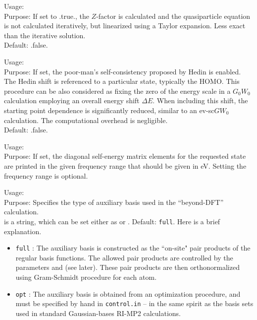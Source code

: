 { \noindent
  Usage:    \\[1.0ex]
  Purpose: If set to .true., the $Z$-factor is calculated
  and the quasiparticle equation is not calculated iteratively,
  but linearized using a Taylor expansion. Less exact than the
  iterative solution. 
   \\
  Default: .false.
}

{ \noindent
  Usage:    \\[1.0ex]
  Purpose: If set, the poor-man's self-consistency proposed
  by Hedin \cite{Hedin1999} is enabled. The Hedin shift is referenced to a particular state, 
  typically the HOMO. This procedure can be also considered as
  fixing the zero of the energy scale in a $G_0W_0$ calculation employing 
  an overall energy shift $\Delta E$. When including this shift, the starting point
  dependence is significantly reduced, similar to an ev-sc$GW_0$ calculation.
  The computational overhead is negligible. 
   \\
  Default: .false.
}

{ \noindent
  Usage:   
   \\[1.0ex]
  Purpose: If set, the diagonal self-energy matrix elements for the requested
  state are printed in the given frequency range that should be given in eV.
  Setting the frequency range is optional.
}

{ \noindent
  Usage:   \\[1.0ex]
  Purpose: Specifies the type of auxiliary basis used in the
  ``beyond-DFT'' calculation. 
    \\[1.0ex]
   is a string, which can be set either as 
  or .   Default: \texttt{full}. Here is a brief explanation.
  \begin{itemize}
     \item  \texttt{full} : The auxiliary basis is constructed as
     the ``on-site" pair products of the regular basis functions. 
     The allowed pair products are controlled by the parameters 
      and
      (see later).
     These pair products
     are then orthonormalized using Gram-Schmidt procedure for each atom. 
     \item  \texttt{opt} : The auxiliary basis is obtained
     from an optimization procedure, and must be specified by
     hand in \texttt{control.in} -- in the same spirit as the basis
     sets used in standard Gaussian-bases RI-MP2 calculations.
  \end{itemize}
}

